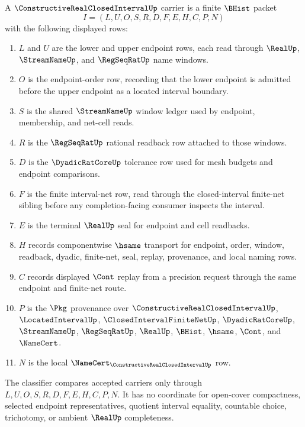 \begin{definition}
\label{def:constructive-real-closed-interval-carrier}
A $\ConstructiveRealClosedIntervalUp$ carrier is a finite $\BHist$ packet
$$
I=(L,U,O,S,R,D,F,E,H,C,P,N)
$$
with the following displayed rows:
\begin{enumerate}
\item $L$ and $U$ are the lower and upper endpoint rows, each read through $\RealUp$, $\StreamNameUp$, and $\RegSeqRatUp$ name windows.
\item $O$ is the endpoint-order row, recording that the lower endpoint is admitted before the upper endpoint as a located interval boundary.
\item $S$ is the shared $\StreamNameUp$ window ledger used by endpoint, membership, and net-cell reads.
\item $R$ is the $\RegSeqRatUp$ rational readback row attached to those windows.
\item $D$ is the $\DyadicRatCoreUp$ tolerance row used for mesh budgets and endpoint comparisons.
\item $F$ is the finite interval-net row, read through the closed-interval finite-net sibling before any completion-facing consumer inspects the interval.
\item $E$ is the terminal $\RealUp$ seal for endpoint and cell readbacks.
\item $H$ records componentwise $\hsame$ transport for endpoint, order, window, readback, dyadic, finite-net, seal, replay, provenance, and local naming rows.
\item $C$ records displayed $\Cont$ replay from a precision request through the same endpoint and finite-net route.
\item $P$ is the $\Pkg$ provenance over $\ConstructiveRealClosedIntervalUp$, $\LocatedIntervalUp$, $\ClosedIntervalFiniteNetUp$, $\DyadicRatCoreUp$, $\StreamNameUp$, $\RegSeqRatUp$, $\RealUp$, $\BHist$, $\hsame$, $\Cont$, and $\NameCert$.
\item $N$ is the local $\NameCert_{\ConstructiveRealClosedIntervalUp}$ row.
\end{enumerate}
The classifier compares accepted carriers only through $L,U,O,S,R,D,F,E,H,C,P,N$. It has no coordinate for open-cover compactness, selected endpoint representatives, quotient interval equality, countable choice, trichotomy, or ambient $\RealUp$ completeness.
\end{definition}

